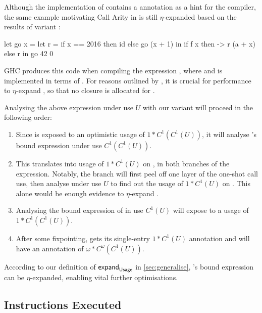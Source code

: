 Although the implementation of  contains a  annotation as a hint for the compiler, the same example motivating Call Arity in \textcite[Section~3.5.1]{callarity} is still $\eta$-expanded based on the results of variant \varedges:
\begin{haskellcode}
  let go x =
       let r = 
            if x == 2016
            then id 
            else go (x + 1)
       in if f x 
          then \a -> r (a + x)
          else r
  in go 42 0
\end{haskellcode}

GHC produces this code when compiling the expression , where  and  is implemented in terms of .
For reasons outlined by \textcite{callarity}, it is crucial for performance to $\eta$-expand , so that no closure is allocated for .

Analysing the above expression under use $U$ with our variant \varedges will proceed in the following order:

\begin{enumerate}
  \item Since  is exposed to an optimistic usage of $1*C^1(C^1(U))$, it will analyse 's bound expression under use $C^1(C^1(U))$.
  \item 
    This translates into usage of $1*C^1(U)$ on , in both branches of the  expression. 
    Notably, the  branch will first peel off one layer of the one-shot call use, then analyse  under use $U$ to find out the usage of $1*C^1(U)$ on .
    This alone would be enough evidence to $\eta$-expand .
  \item Analysing the bound expression of  in use $C^1(U)$ will expose  to a usage of $1*C^1(C^1(U))$. 
  \item After some fixpointing,  gets its single-entry $1*C^1(U)$ annotation and  will have an annotation of $\omega*C^\omega(C^1(U))$.
\end{enumerate}

According to our definition of $\mathsf{expand}_{\text{\textsf{Usage}}}$ in \cref{sec:generalise}, 's bound expression can be $\eta$-expanded, enabling vital further optimisations.

\subsection{Instructions Executed}\label{sec:instr}


